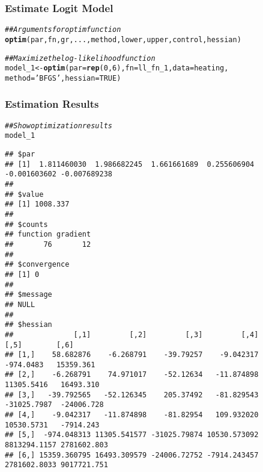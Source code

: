 \documentclass{beamer}\usepackage[]{graphicx}\usepackage[]{xcolor}
\makeatletter
\newcommand{\hlnum}[1]{\textcolor[rgb]{0.686,0.059,0.569}{#1}}%
\newcommand{\hlstr}[1]{\textcolor[rgb]{0.192,0.494,0.8}{#1}}%
\newcommand{\hlcom}[1]{\textcolor[rgb]{0.678,0.584,0.686}{\textit{#1}}}%
\newcommand{\hlstd}[1]{\textcolor[rgb]{0.345,0.345,0.345}{#1}}%
\newcommand{\hlkwb}[1]{\textcolor[rgb]{0.69,0.353,0.396}{#1}}%
\newcommand{\hlkwc}[1]{\textcolor[rgb]{0.333,0.667,0.333}{#1}}%
\newcommand{\hlkwd}[1]{\textcolor[rgb]{0.737,0.353,0.396}{\textbf{#1}}}%
\newenvironment{kframe}{%
 \def\at@end@of@kframe{}%
 \ifinner\ifhmode%
  \def\at@end@of@kframe{\end{minipage}}%
  \begin{minipage}{\columnwidth}%
 \fi\fi%
 \def\FrameCommand##1{\hskip\@totalleftmargin \hskip-\fboxsep
 \colorbox{shadecolor}{##1}\hskip-\fboxsep
     \hskip-\linewidth \hskip-\@totalleftmargin \hskip\columnwidth}%
 \MakeFramed {\advance\hsize-\width
   \@totalleftmargin\z@ \linewidth\hsize
   \@setminipage}}%
 {\par\unskip\endMakeFramed%
 \at@end@of@kframe}
\newenvironment{knitrout}{}{} %
\makeatother
\begin{document}
\begin{frame}[fragile]\frametitle{Estimate Logit Model}
\begin{knitrout}\footnotesize
{}\color{fgcolor}\begin{kframe}
\begin{alltt}
\hlcom{## Arguments for optim function}
\hlkwd{optim}\hlstd{(par, fn, gr, ..., method, lower, upper, control, hessian)}
\end{alltt}
\end{kframe}
\end{knitrout}
    \vspace{2ex}
\begin{knitrout}\footnotesize
{}\color{fgcolor}\begin{kframe}
\begin{alltt}
\hlcom{## Maximize the log-likelihood function}
\hlstd{model_1} \hlkwb{<-} \hlkwd{optim}\hlstd{(}\hlkwc{par} \hlstd{=} \hlkwd{rep}\hlstd{(}\hlnum{0}\hlstd{,} \hlnum{6}\hlstd{),} \hlkwc{fn} \hlstd{= ll_fn_1,} \hlkwc{data} \hlstd{= heating,}
                 \hlkwc{method} \hlstd{=} \hlstr{'BFGS'}\hlstd{,} \hlkwc{hessian} \hlstd{=} \hlnum{TRUE}\hlstd{)}
\end{alltt}
\end{kframe}
\end{knitrout}
\end{frame}

\begin{frame}[fragile]\frametitle{Estimation Results}
    \vspace{1ex}
    
\begin{knitrout}\tiny
{}\color{fgcolor}\begin{kframe}
\begin{alltt}
\hlcom{## Show optimization results}
\hlstd{model_1}
\end{alltt}
\begin{verbatim}
## $par
## [1]  1.811460030  1.986682245  1.661661689  0.255606904 -0.001603602 -0.007689238
## 
## $value
## [1] 1008.337
## 
## $counts
## function gradient 
##       76       12 
## 
## $convergence
## [1] 0
## 
## $message
## NULL
## 
## $hessian
##              [,1]         [,2]         [,3]         [,4]         [,5]        [,6]
## [1,]    58.682876    -6.268791    -39.79257    -9.042317    -974.0483   15359.361
## [2,]    -6.268791    74.971017    -52.12634   -11.874898   11305.5416   16493.310
## [3,]   -39.792565   -52.126345    205.37492   -81.829543  -31025.7987  -24006.728
## [4,]    -9.042317   -11.874898    -81.82954   109.932020   10530.5731   -7914.243
## [5,]  -974.048313 11305.541577 -31025.79874 10530.573092 8813294.1157 2781602.803
## [6,] 15359.360795 16493.309579 -24006.72752 -7914.243457 2781602.8033 9017721.751
\end{verbatim}
\end{kframe}
\end{knitrout}
\end{frame}
\end{document}
